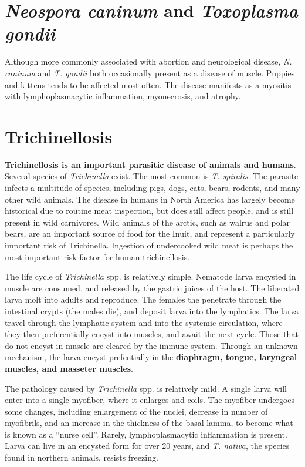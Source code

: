 \documentclass[openany]{book}
\begin{document}
\section{\texorpdfstring{\emph{Neospora caninum} and \emph{Toxoplasma
gondii}}{Neospora caninum and Toxoplasma gondii}}\label{neospora-caninum-and-toxoplasma-gondii}

Although more commonly associated with abortion and neurological
disease, \emph{N. caninum} and \emph{T. gondii} both occasionally
present as a disease of muscle. Puppies and kittens tends to be affected
most often. The disease manifests as a myositis with lymphoplasmacytic
inflammation, myonecrosis, and atrophy.

\section{Trichinellosis}\label{trichinellosis}

\textbf{Trichinellosis is an important parasitic disease of animals and
humans}. Several species of \emph{Trichinella} exist. The most common is
\emph{T. spiralis}. The parasite infects a multitude of species,
including pigs, dogs, cats, bears, rodents, and many other wild animals.
The disease in humans in North America has largely become historical due
to routine meat inspection, but does still affect people, and is still
present in wild carnivores. Wild animals of the arctic, such as walrus
and polar bears, are an important source of food for the Inuit, and
represent a particularly important risk of Trichinella. Ingestion of
undercooked wild meat is perhaps the most important risk factor for
human trichinellosis.

The life cycle of \emph{Trichinella} spp. is relatively simple. Nematode
larva encysted in muscle are consumed, and released by the gastric
juices of the host. The liberated larva molt into adults and reproduce.
The females the penetrate through the intestinal crypts (the males die),
and deposit larva into the lymphatics. The larva travel through the
lymphatic system and into the systemic circulation, where they then
preferentially encyst into muscles, and await the next cycle. Those that
do not encyst in muscle are cleared by the immune system. Through an
unknown mechanism, the larva encyst prefentially in the
\textbf{diaphragm, tongue, laryngeal muscles, and masseter muscles}.

The pathology caused by \emph{Trichinella} spp. is relatively mild. A
single larva will enter into a single myofiber, where it enlarges and
coils. The myofiber undergoes some changes, including enlargement of the
nuclei, decrease in number of myofibrils, and an increase in the
thickness of the basal lamina, to become what is known as a ``nurse
cell''. Rarely, lymphoplasmacytic inflammation is present. Larva can
live in an encysted form for over 20 years, and \emph{T. nativa}, the
species found in northern animals, resists freezing.
\end{document}

